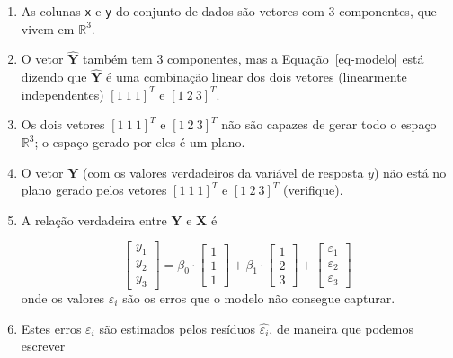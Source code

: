 \documentclass[
  letterpaper,
  DIV=11,
  numbers=noendperiod]{scrreprt}
\begin{document}
\begin{enumerate}
\def\labelenumi{\arabic{enumi}.}
\item
  As colunas \texttt{x} e \texttt{y} do conjunto de dados são vetores
  com $3$ componentes, que vivem em $\mathbb{R}^3$.
\item
  O vetor $\mathbf{\widehat Y}$ também tem $3$ componentes, mas a
  Equação~\ref{eq-modelo} está dizendo que $\mathbf{\widehat Y}$ é uma
  combinação linear dos dois vetores (linearmente independentes)
  $[1\ 1\ 1]^T$ e $[1\ 2\ 3]^T$.
\item
  Os dois vetores $[1\ 1\ 1]^T$ e $[1\ 2\ 3]^T$ não são capazes de gerar
  todo o espaço $\mathbb{R}^3$; o espaço gerado por eles é um plano.
\item
  O vetor $\mathbf{Y}$ (com os valores verdadeiros da variável de
  resposta $y$) não está no plano gerado pelos vetores $[1\ 1\ 1]^T$ e
  $[1\ 2\ 3]^T$ (verifique).
\item
  A relação verdadeira entre $\mathbf{Y}$ e $\mathbf{X}$ é

  \[
   \begin{bmatrix}
     y_1 \\ {y_2} \\ {y_3}
   \end{bmatrix}
   =
   \beta_0 \cdot 
   \begin{bmatrix}
     1 \\ 1 \\ 1
   \end{bmatrix}
   + 
   \beta_1 \cdot
   \begin{bmatrix}
     1 \\ 2 \\ 3
   \end{bmatrix}
   +
   \begin{bmatrix}
     \varepsilon_1 \\ \varepsilon_2 \\ \varepsilon_3
   \end{bmatrix}
  \] onde os valores $\varepsilon_i$ são os erros que o modelo não
  consegue capturar.
\item
  Estes erros $\varepsilon_i$ são estimados pelos resíduos
  $\widehat{\varepsilon_i}$, de maneira que podemos escrever


\end{enumerate}
\end{document}
